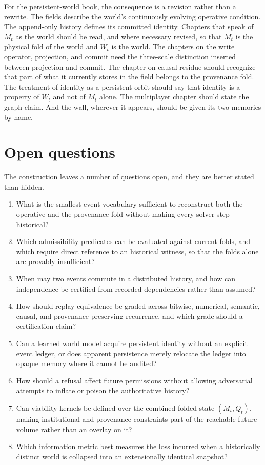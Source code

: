 \documentclass[11pt]{article}
\begin{document}
For the persistent-world book, the consequence is a revision rather than a rewrite. The fields describe the world's continuously evolving operative condition. The append-only history defines its committed identity. Chapters that speak of $M_t$ as the world should be read, and where necessary revised, so that $M_t$ is the physical fold of the world and $W_t$ is the world. The chapters on the write operator, projection, and commit need the three-scale distinction inserted between projection and commit. The chapter on causal residue should recognize that part of what it currently stores in the field belongs to the provenance fold. The treatment of identity as a persistent orbit should say that identity is a property of $W_t$ and not of $M_t$ alone. The multiplayer chapter should state the graph claim. And the wall, wherever it appears, should be given its two memories by name.

\section{Open questions}

The construction leaves a number of questions open, and they are better stated than hidden.

\begin{enumerate}
\item What is the smallest event vocabulary sufficient to reconstruct both the operative and the provenance fold without making every solver step historical?
\item Which admissibility predicates can be evaluated against current folds, and which require direct reference to an historical witness, so that the folds alone are provably insufficient?
\item When may two events commute in a distributed history, and how can independence be certified from recorded dependencies rather than assumed?
\item How should replay equivalence be graded across bitwise, numerical, semantic, causal, and provenance-preserving recurrence, and which grade should a certification claim?
\item Can a learned world model acquire persistent identity without an explicit event ledger, or does apparent persistence merely relocate the ledger into opaque memory where it cannot be audited?
\item How should a refusal affect future permissions without allowing adversarial attempts to inflate or poison the authoritative history?
\item Can viability kernels be defined over the combined folded state $(M_t, Q_t)$, making institutional and provenance constraints part of the reachable future volume rather than an overlay on it?
\item Which information metric best measures the loss incurred when a historically distinct world is collapsed into an extensionally identical snapshot?
\end{enumerate}
\end{document}
